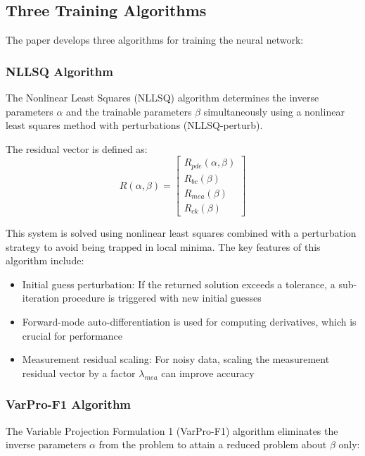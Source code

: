 \documentclass[11pt,a4paper]{article}
\begin{document}
\subsection{Three Training Algorithms}

The paper develops three algorithms for training the neural network:

\subsubsection{NLLSQ Algorithm}

The Nonlinear Least Squares (NLLSQ) algorithm determines the inverse parameters $\alpha$ and the trainable parameters $\beta$ simultaneously using a nonlinear least squares method with perturbations (NLLSQ-perturb).

The residual vector is defined as:
\begin{equation}
R(\alpha, \beta) = \begin{bmatrix}
R_{pde}(\alpha, \beta) \\
R_{bc}(\beta) \\
R_{mea}(\beta) \\
R_{ck}(\beta)
\end{bmatrix}
\end{equation}

This system is solved using nonlinear least squares combined with a perturbation strategy to avoid being trapped in local minima. The key features of this algorithm include:
\begin{itemize}
    \item Initial guess perturbation: If the returned solution exceeds a tolerance, a sub-iteration procedure is triggered with new initial guesses
    \item Forward-mode auto-differentiation is used for computing derivatives, which is crucial for performance
    \item Measurement residual scaling: For noisy data, scaling the measurement residual vector by a factor $\lambda_{mea}$ can improve accuracy
\end{itemize}

\subsubsection{VarPro-F1 Algorithm}

The Variable Projection Formulation 1 (VarPro-F1) algorithm eliminates the inverse parameters $\alpha$ from the problem to attain a reduced problem about $\beta$ only:
\end{document}
